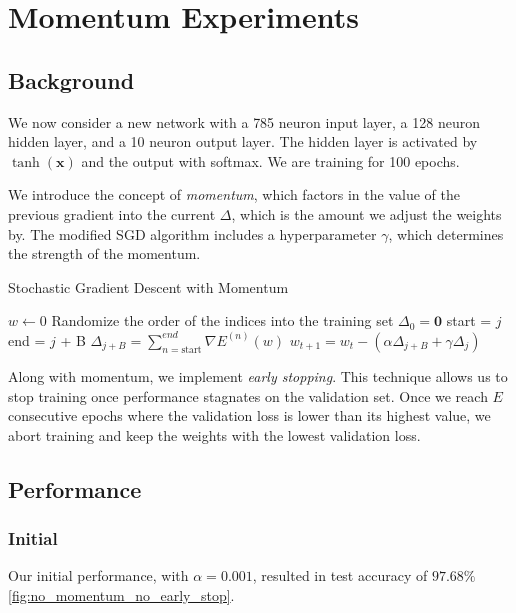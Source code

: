 \section{Momentum Experiments}

\subsection{Background}

We now consider a new network with a 785 neuron input layer, a 128 neuron
hidden layer, and a 10 neuron output layer. The hidden layer is activated by
$\tanh(\mathbf x)$ and the output with softmax. We are training for 100 epochs.

We introduce the concept of \textit{momentum}, which factors in the value of the
previous gradient into the current $\Delta$, which is the amount we adjust the weights by.
The modified SGD algorithm includes a hyperparameter $\gamma$, which determines the strength
of the momentum.

\begin{algorithm}
	\caption{Stochastic Gradient Descent with Momentum}
	\begin{algorithmic}
		\State $w \gets 0$
		\State Randomize the order of the indices into the training set
		\State $\Delta_{0} = \mathbf 0$
		\State start = $j$
		\State end = $j$ + B
		\State $\Delta_{j+B} = \sum_{n = \text{start}}^{end} \nabla E^{(n)}(w)$
		\State $w_{t + 1} = w_t - (\alpha \Delta_{j+B} + \gamma \Delta_{j})$
		\EndFor
		\EndFor
	\end{algorithmic}
\end{algorithm}


Along with momentum, we implement \textit{early stopping}. This technique allows us
to stop training once performance stagnates on the validation set. Once  we reach
$E$ consecutive epochs where the validation loss is lower than its highest value, we
abort training and keep the weights with the lowest validation loss.


\subsection{Performance}

\subsubsection{Initial}

Our initial performance, with $\alpha = 0.001$, resulted in test accuracy of $97.68\%$\cref{fig:no_momentum_no_early_stop}.

